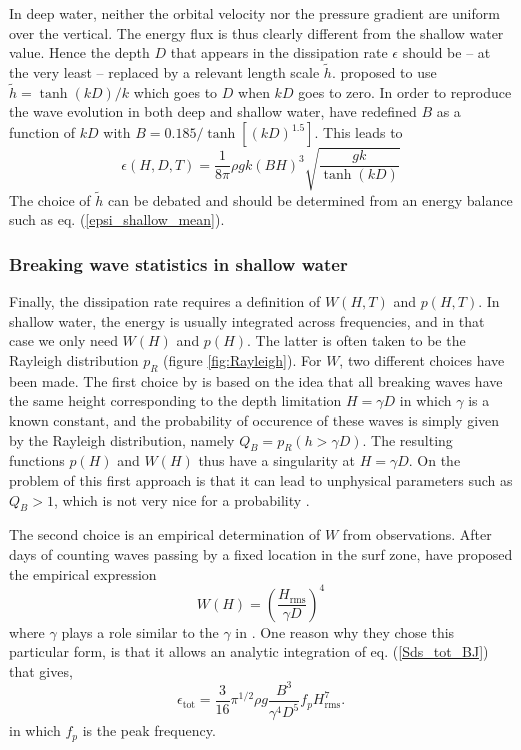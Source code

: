 In deep water, neither the orbital velocity nor the pressure gradient are uniform over the vertical. 
The energy flux is thus clearly different from the shallow water value. 
Hence the depth $D$ that appears in the dissipation rate $\epsilon$ should be -- at the very least -- replaced by a relevant length scale $\widetilde{h}$. 
\cite{Chawla&Kirby2002} proposed to use $\widetilde{h}=\tanh(kD)/k$  which goes to $D$ when $kD$  goes to zero. In order to reproduce the wave evolution 
in both deep and shallow water, \cite{Filipot&al.2010b} have redefined  $B$ as a function of $kD$ with $B=0.185 / \tanh[(kD)^{1.5}]$. 
This leads to 
\begin{equation}
    \epsilon(H,D,T) = \frac{1}{8 \pi} \rho g k \left(B H \right)^3 \sqrt{\frac{gk}{\tanh(kD)}} \label{eps_CK2002}
\end{equation}
The choice of  $\widetilde{h}$  can be debated and should be determined from an energy balance such as  eq. (\ref{epsi_shallow_mean}). 



\subsubsection{Breaking wave statistics in shallow water\label{TG1983}}
Finally, the dissipation rate requires a definition of  $W(H,T)$ and $p\left(H,T\right)$. 
In shallow water, the energy is usually integrated across frequencies, and  in that case we only need $W(H)$ and $p\left(H\right)$. The latter is often taken to be the Rayleigh distribution $p_R$ (figure \ref{fig:Rayleigh}). 
For $W$, two different choices have been made. The first choice by \cite{Battjes&Janssen1978} 
is based on the idea that all breaking waves have the same height corresponding to the depth limitation  
$H=\gamma  D$ in which $\gamma$ is a known constant, and the probability of occurence of these waves is simply given by the Rayleigh distribution, namely 
$Q_B=p_R(h > \gamma D)$. The resulting functions $p(H)$ and $W(H)$ thus have a singularity at $H= \gamma D$. On the problem of this first approach is 
that it can lead to unphysical parameters such as $Q_B > 1$, which is not very nice for a probability 
\citep{Janssen&Battjes2006}. 

The second choice is an empirical determination of  $W$  from observations. After days of counting waves passing by a fixed location in the surf zone, 
\cite{Thornton&Guza1983} have proposed the empirical expression
\begin{equation}
    W(H)=\left(\frac{H_{\mathrm{rms}}}{\gamma D}\right)^4
\end{equation}
where $\gamma$ plays a role similar to the $\gamma$ in  \cite{Battjes&Janssen1978}. One reason why they chose this particular form, is that it allows an analytic 
integration of eq. (\ref{Sds_tot_BJ}) that gives,
\begin{equation}
    \epsilon_{\mathrm{tot}} = \frac{3}{16} \pi^{1/2} \rho g \frac{B^3}{\gamma^4 D^5}f_p
    H_{\mathrm{rms}}^7.
\end{equation}
in which $f_p$ is the peak frequency. 

